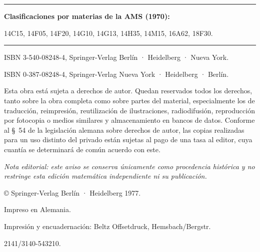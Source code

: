 \vfill

\hrule
\medskip
\textbf{Clasificaciones por materias de la AMS (1970):}\par
14C15, 14F05, 14F20, 14G10, 14G13, 14H35, 14M15, 16A62, 18F30.
\medskip
\hrule

\medskip
ISBN 3-540-08248-4, Springer-Verlag Berlín · Heidelberg · Nueva York.\par
ISBN 0-387-08248-4, Springer-Verlag Nueva York · Heidelberg · Berlín.

\medskip
Esta obra está sujeta a derechos de autor. Quedan reservados todos los derechos, tanto sobre la obra completa como sobre partes del material, especialmente los de traducción, reimpresión, reutilización de ilustraciones, radiodifusión, reproducción por fotocopia o medios similares y almacenamiento en bancos de datos. Conforme al §~54 de la legislación alemana sobre derechos de autor, las copias realizadas para un uso distinto del privado están sujetas al pago de una tasa al editor, cuya cuantía se determinará de común acuerdo con este.

\medskip
\emph{Nota editorial: este aviso se conserva únicamente como procedencia histórica y no restringe esta edición matemática independiente ni su publicación.}\par

\medskip
© Springer-Verlag Berlín · Heidelberg 1977.\par
Impreso en Alemania.\par
Impresión y encuadernación: Beltz Offsetdruck, Hemsbach/Bergstr.\par
2141/3140-543210.
\clearpage
